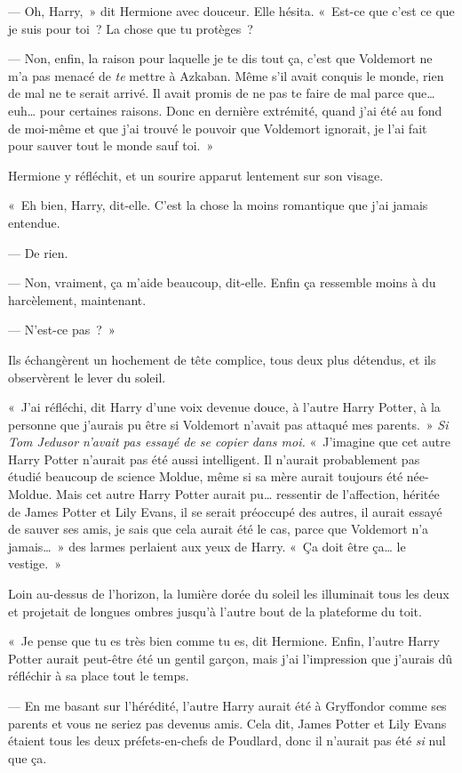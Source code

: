--- Oh, Harry,~» dit Hermione avec douceur.
Elle hésita.
«~Est-ce que c'est ce que je suis pour toi~?
La chose que tu protèges~?

--- Non, enfin, la raison pour laquelle je te dis tout ça, c'est que Voldemort ne m'a pas menacé de \emph{te} mettre à Azkaban.
Même s'il avait conquis le monde, rien de mal ne te serait arrivé.
Il avait promis de ne pas te faire de mal parce que… euh… pour certaines raisons.
Donc en dernière extrémité, quand j'ai été au fond de moi-même et que j'ai trouvé le pouvoir que Voldemort ignorait, je l'ai fait pour sauver tout le monde sauf toi.~»

Hermione y réfléchit, et un sourire apparut lentement sur son visage.

«~Eh bien, Harry, dit-elle.
C'est la chose la moins romantique que j'ai jamais entendue.

--- De rien.

--- Non, vraiment, ça m'aide beaucoup, dit-elle.
Enfin ça ressemble moins à du harcèlement, maintenant.

--- N'est-ce pas~?~»

Ils échangèrent un hochement de tête complice, tous deux plus détendus, et ils observèrent le lever du soleil.

«~J'ai réfléchi, dit Harry d'une voix devenue douce, à l'autre Harry Potter, à la personne que j'aurais pu être si Voldemort n'avait pas attaqué mes parents.~»
\emph{Si Tom Jedusor n'avait pas essayé de se copier dans moi.} «~J'imagine que cet autre Harry Potter n'aurait pas été aussi intelligent.
Il n'aurait probablement pas étudié beaucoup de science Moldue, même si sa mère aurait toujours été née-Moldue.
Mais cet autre Harry Potter aurait pu… ressentir de l'affection, héritée de James Potter et Lily Evans, il se serait préoccupé des autres, il aurait essayé de sauver ses amis, je sais que cela aurait été le cas, parce que Voldemort n'a jamais…~»
des larmes perlaient aux yeux de Harry.
«~Ça doit être ça… le vestige.~»

Loin au-dessus de l'horizon, la lumière dorée du soleil les illuminait tous les deux et projetait de longues ombres jusqu'à l'autre bout de la plateforme du toit.

«~Je pense que tu es très bien comme tu es, dit Hermione.
Enfin, l'autre Harry Potter aurait peut-être été un gentil garçon, mais j'ai l'impression que j'aurais dû réfléchir à sa place tout le temps.

--- En me basant sur l'hérédité, l'autre Harry aurait été à Gryffondor comme ses parents et vous ne seriez pas devenus amis.
Cela dit, James Potter et Lily Evans étaient tous les deux préfets-en-chefs de Poudlard, donc il n'aurait pas été \emph{si} nul que ça.

